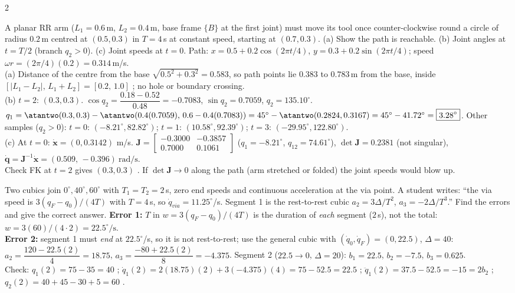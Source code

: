 \begin{multicols}{2}
\begin{examq}
A planar RR arm ($L_1=0.6$\,m, $L_2=0.4$\,m, base frame $\{B\}$ at the first joint) must move its tool once counter-clockwise round a circle of radius $0.2$\,m centred at $(0.5,0.3)$ in $T=4$\,s at constant speed, starting at $(0.7,0.3)$. (a) Show the path is reachable. (b) Joint angles at $t=T/2$ (branch $q_2>0$). (c) Joint speeds at $t=0$.
\solution
Path: $x=0.5+0.2\cos(2\pi t/4)$, $y=0.3+0.2\sin(2\pi t/4)$; speed $\omega r=(2\pi/4)(0.2)=0.314$\,m/s.\\
(a) Distance of the centre from the base $\sqrt{0.5^2+0.3^2}=0.583$, so path points lie $0.383$ to $0.783$\,m from the base, inside $[|L_1-L_2|,\,L_1+L_2]=[0.2,\,1.0]$ \checkmark; no hole or boundary crossing.\\
(b) $t=2$: $(0.3,0.3)$. $\cos q_2=\dfrac{0.18-0.52}{0.48}=-0.7083$, $\sin q_2=0.7059$, $q_2=135.10^\circ$. $q_1=\atantwo(0.3,0.3)-\atantwo(0.4(0.7059),\,0.6-0.4(0.7083))=45^\circ-\atantwo(0.2824,0.3167)=45^\circ-41.72^\circ=\boxed{3.28^\circ}$. Other samples ($q_2>0$): $t=0$: $(-8.21^\circ,82.82^\circ)$; $t=1$: $(10.58^\circ,92.39^\circ)$; $t=3$: $(-29.95^\circ,122.80^\circ)$.\\
(c) At $t=0$: $\dot{\mathbf x}=(0,0.3142)$ m/s. $\mathbf J=\begin{bmatrix}-0.3000&-0.3857\\0.7000&0.1061\end{bmatrix}$ ($q_1=-8.21^\circ$, $q_{12}=74.61^\circ$), $\det\mathbf J=0.2381$ (not singular), $\dot{\mathbf q}=\mathbf J^{-1}\dot{\mathbf x}=\boxed{(0.509,\,-0.396)\ \text{rad/s}}$. \chk\\
Check FK at $t=2$ gives $(0.3,0.3)$ \checkmark. If $\det\mathbf J\to0$ along the path (arm stretched or folded) the joint speeds would blow up.
\end{examq}

\begin{examq}
Two cubics join $0^\circ,40^\circ,60^\circ$ with $T_1=T_2=2$\,s, zero end speeds and continuous acceleration at the via point. A student writes: ``the via speed is $3(q_F-q_0)/(4T)$ with $T=4$\,s, so $\dot q_{via}=11.25^\circ$/s. Segment 1 is the rest-to-rest cubic $a_2=3\Delta/T^2$, $a_3=-2\Delta/T^3$.'' Find the errors and give the correct answer.
\solution
\textbf{Error 1:} $T$ in $w=3(q_F-q_0)/(4T)$ is the duration of \emph{each} segment ($2$\,s), not the total: $w=3(60)/(4\cdot2)=\boxed{22.5^\circ/\text{s}}$.\\
\textbf{Error 2:} segment 1 must \emph{end} at $22.5^\circ$/s, so it is not rest-to-rest; use the general cubic with $(\dot q_0,\dot q_F)=(0,22.5)$, $\Delta=40$: $a_2=\dfrac{120-22.5(2)}{4}=18.75$, $a_3=\dfrac{-80+22.5(2)}{8}=-4.375$. Segment 2 ($22.5\to0$, $\Delta=20$): $b_1=22.5$, $b_2=-7.5$, $b_3=0.625$.\\
Check: $q_1(2)=75-35=40$ \checkmark; $\dot q_1(2)=2(18.75)(2)+3(-4.375)(4)=75-52.5=22.5$ \checkmark; $\ddot q_1(2)=37.5-52.5=-15=2b_2$ \checkmark; $q_2(2)=40+45-30+5=60$ \checkmark. \chk
\end{examq}

\end{multicols}
